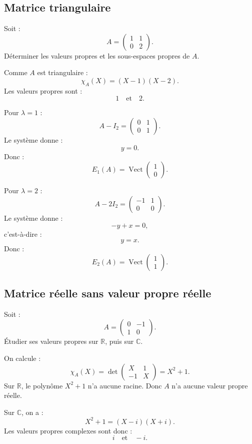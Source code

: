 \documentclass[11pt,a4paper]{article}
\newcommand{\R}{\mathbb R}
\newcommand{\C}{\mathbb C}
\newcommand{\Vect}{\operatorname{Vect}}
\begin{document}
\subsection{Matrice triangulaire}

\begin{exercicebox}
Soit :
\[
A=
\begin{pmatrix}
1&1\\
0&2
\end{pmatrix}.
\]
Déterminer les valeurs propres et les sous-espaces propres de \(A\).
\end{exercicebox}

\begin{correctionbox}
Comme \(A\) est triangulaire :
\[
\chi_A(X)=(X-1)(X-2).
\]
Les valeurs propres sont :
\[
1
\quad\text{et}\quad
2.
\]

Pour \(\lambda=1\) :
\[
A-I_2=
\begin{pmatrix}
0&1\\
0&1
\end{pmatrix}.
\]
Le système donne :
\[
y=0.
\]
Donc :
\[
E_1(A)=\Vect
\begin{pmatrix}
1\\0
\end{pmatrix}.
\]

Pour \(\lambda=2\) :
\[
A-2I_2=
\begin{pmatrix}
-1&1\\
0&0
\end{pmatrix}.
\]
Le système donne :
\[
-y+x=0,
\]
c'est-à-dire :
\[
y=x.
\]
Donc :
\[
E_2(A)=\Vect
\begin{pmatrix}
1\\1
\end{pmatrix}.
\]
\end{correctionbox}

\subsection{Matrice réelle sans valeur propre réelle}

\begin{exercicebox}
Soit :
\[
A=
\begin{pmatrix}
0&-1\\
1&0
\end{pmatrix}.
\]
Étudier ses valeurs propres sur \(\R\), puis sur \(\C\).
\end{exercicebox}

\begin{correctionbox}
On calcule :
\[
\chi_A(X)=
\det
\begin{pmatrix}
X&1\\
-1&X
\end{pmatrix}
=
X^2+1.
\]
Sur \(\R\), le polynôme \(X^2+1\) n'a aucune racine.  
Donc \(A\) n'a aucune valeur propre réelle.

Sur \(\C\), on a :
\[
X^2+1=(X-i)(X+i).
\]
Les valeurs propres complexes sont donc :
\[
i
\quad\text{et}\quad
-i.
\]
\end{correctionbox}
\end{document}
